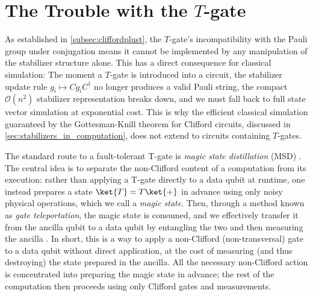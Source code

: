 




\section{The Trouble with the \texorpdfstring{$T$}{T}-gate}\label{sec:t_gate}

As established in \cref{subsec:cliffordplust}, the $T$-gate's incompatibility with the Pauli group under conjugation means it cannot be implemented by any manipulation of the stabilizer structure alone. This has a direct consequence for classical simulation: The moment a $T$-gate is introduced into a circuit, the stabilizer update rule $g_i \mapsto Cg_iC^\dagger$ no longer produces a valid Pauli string, the compact $\mathcal{O}(n^2)$ stabilizer representation breaks down, and we must fall back to full state vector simulation at exponential cost. This is why the efficient classical simulation guaranteed by the Gottesman-Knill theorem for Clifford circuits, discussed in \cref{sec:stabilizers_in_computation}, does not extend to circuits containing $T$-gates.

The standard route to a fault-tolerant T-gate is \emph{magic state distillation} (MSD) \cite{Bravyi_2005}. The central idea is to separate the non-Clifford content of a computation from its execution: rather than applying a T-gate directly to a data qubit at runtime, one instead prepares a state $\ket{T} = T\ket{+}$ in advance using only noisy physical operations, which we call a \emph{magic state}. Then, through a method known as \emph{gate teleportation}, the magic state is consumed, and we effectively transfer it from the ancilla qubit to a data qubit by entangling the two and then measuring the ancilla \cite{Nielsen_Chuang_2010}. In short, this is a way to apply a non-Clifford (non-transversal) gate to a data qubit without direct application, at the cost of measuring (and thus destroying) the state prepared in the ancilla. All the necessary non-Clifford action is concentrated into preparing the magic state in advance; the rest of the computation then proceeds using only Clifford gates and measurements.

